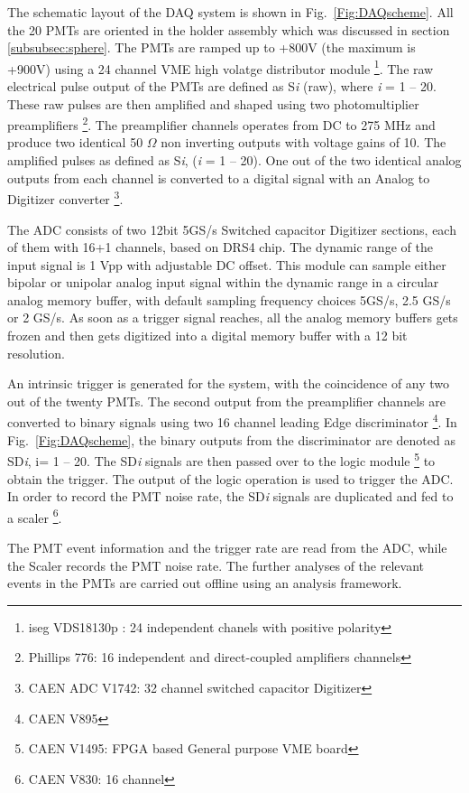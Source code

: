 The schematic layout 
of the DAQ system is shown in Fig.~{\ref{Fig:DAQscheme}}. All the 20 PMTs 
are oriented in the holder assembly which was discussed in section \ref{subsubsec:sphere}. 
The PMTs are ramped up to +800V (the maximum is +900V) using a 24 channel 
VME high volatge distributor module \footnote{iseg VDS18130p : 24 independent chanels with positive polarity}.  
The raw electrical pulse output of the PMTs are defined as S{\it i} (raw), where {\it i} = 1 -- 20. 
These raw pulses are then 
amplified and shaped using two photomultiplier preamplifiers \footnote{Phillips 776: 16 independent  and direct-coupled 
amplifiers channels}. The preamplifier channels operates from DC to 275 MHz and 
produce two identical 50 $\Omega$ non inverting outputs with voltage gains of 10. 
The amplified pulses as defined as S{\it i}, ({\it i} = 1 -- 20). One out of the 
two identical analog outputs from each channel is converted to a digital 
signal with an Analog to Digitizer converter \footnote{CAEN ADC V1742: 
32 channel switched capacitor Digitizer}. 


The ADC consists of two 12bit 5GS/s Switched capacitor Digitizer sections, 
each of them with 16+1 channels, based on DRS4 chip. The dynamic range of the input signal is 1 
Vpp with adjustable DC offset. This module can sample either bipolar or unipolar analog input 
signal within the dynamic range in a circular 
analog memory buffer, with default sampling frequency choices 5GS/s, 2.5 GS/s 
or 2 GS/s. As soon as a trigger signal reaches, all the analog memory 
buffers gets frozen and then gets digitized into a digital memory buffer 
with a 12 bit resolution. 

An intrinsic trigger is generated for the system, 
with the coincidence of any two out of the twenty PMTs. The second output from the 
preamplifier channels are converted to binary signals using two 16 channel leading 
Edge discriminator \footnote{CAEN V895}. In Fig.~\ref{Fig:DAQscheme}, the binary 
outputs from the discriminator are denoted as SD{\it i}, i= 1 -- 20. The SD{\it i} signals are then passed over to 
the logic module \footnote{CAEN V1495: FPGA based General purpose VME board} to obtain the trigger. The output of the logic operation is 
used to trigger the ADC. In order to record the PMT noise rate, the 
SD{\it i} signals are duplicated and fed to a scaler \footnote{CAEN V830: 16 channel}.

The PMT event information and the trigger rate are read from the ADC, while the Scaler 
records the PMT noise rate. The further analyses of the 
relevant events in the PMTs are carried out offline using an analysis 
framework.










